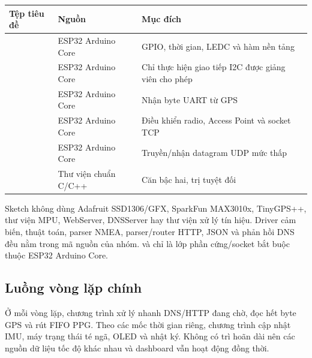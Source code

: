\documentclass[12pt]{article}
\begin{document}
\small
\noindent\begin{tabularx}{\textwidth}{L{3.6cm} L{3.1cm} Y}
\toprule
\textbf{Tệp tiêu đề} & \textbf{Nguồn} & \textbf{Mục đích}\\
\midrule
{} & ESP32 Arduino Core & GPIO, thời gian, LEDC và hàm nền tảng\\
 & ESP32 Arduino Core & Chỉ thực hiện giao tiếp I2C được giảng viên cho phép\\
 & ESP32 Arduino Core & Nhận byte UART từ GPS\\
 & ESP32 Arduino Core & Điều khiển radio, Access Point và socket TCP\\
 & ESP32 Arduino Core & Truyền/nhận datagram UDP mức thấp\\
 & Thư viện chuẩn C/C++ & Căn bậc hai, trị tuyệt đối\\
\bottomrule
\end{tabularx}
\normalsize

Sketch không dùng Adafruit SSD1306/GFX, SparkFun MAX3010x, TinyGPS++, thư viện MPU, WebServer, DNSServer hay thư viện xử lý tín hiệu. Driver cảm biến, thuật toán, parser NMEA, parser/router HTTP, JSON và phản hồi DNS đều nằm trong mã nguồn của nhóm.  và  chỉ là lớp phần cứng/socket bắt buộc thuộc ESP32 Arduino Core.

\subsection{Luồng vòng lặp chính}

Ở mỗi vòng lặp, chương trình xử lý nhanh DNS/HTTP đang chờ, đọc hết byte GPS và rút FIFO PPG. Theo các mốc thời gian riêng, chương trình cập nhật IMU, máy trạng thái té ngã, OLED và nhật ký. Không có trì hoãn dài nên các nguồn dữ liệu tốc độ khác nhau và dashboard vẫn hoạt động đồng thời.
\end{document}
